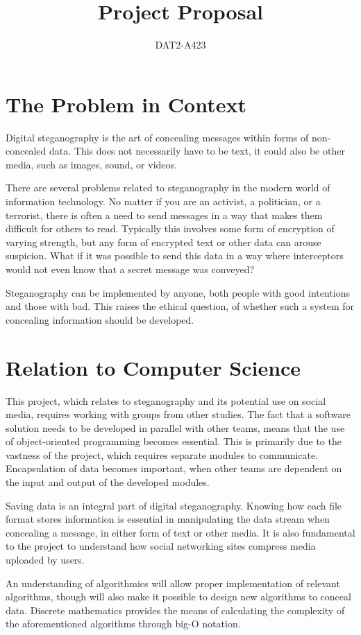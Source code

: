 \documentclass[a4paper,12pt,hidelinks]{article}
\newcommand{\group}{DAT2-A423}
\begin{document}
	\title{Project Proposal}
	\author{\group}
	\maketitle	
	\section*{The Problem in Context}
Digital steganography is the art of concealing messages within forms of non-concealed data. This does not necessarily have to be text, it could also be other media, such as images, sound, or videos.

There are several problems related to steganography in the modern world of information technology. No matter if you are an activist, a politician, or a terrorist, there is often a need to send messages in a way that makes them difficult for others to read. Typically this involves some form of encryption of varying strength, but any form of encrypted text or other data can arouse suspicion. What if it was possible to send this data in a way where interceptors would not even know that a secret message was conveyed? 

Steganography can be implemented by anyone, both people with good intentions and those with bad. This raises the ethical question, of whether such a system for concealing information should be developed.

	\section*{Relation to Computer Science}
This project, which relates to steganography and its potential use on social media, requires working with groups from other studies. The fact that a software solution needs to be developed in parallel with other teams, means that the use of object-oriented programming becomes essential. This is primarily due to the vastness of the project, which requires separate modules to communicate. Encapsulation of data becomes important, when other teams are dependent on the input and output of the developed modules.
	
Saving data is an integral part of digital steganography. Knowing how each file format stores information is essential in manipulating the data stream when concealing a message, in either form of text or other media. 
It is also fundamental to the project to understand how social networking sites compress media uploaded by users.

An understanding of algorithmics will allow proper implementation of relevant algorithms, though will also make it possible to design new algorithms to conceal data. Discrete mathematics provides the means of calculating the complexity of the aforementioned algorithms through big-O notation.
\end{document}

